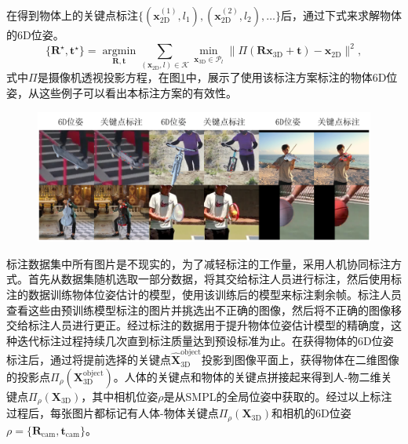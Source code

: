 在得到物体上的关键点标注$\{(\mathbf{x}_{\text{2D}}^{(1)}, l_1), (\mathbf{x}_{\text{2D}}^{(2)}, l_2), \dots\}$后，通过下式来求解物体的6D位姿。
\begin{equation}
	\{\mathbf{R}^\star, \mathbf{t}^\star\} = \mathop{\arg \min}\limits_{\mathbf{R}, \mathbf{t}} \sum_{(\mathbf{x}_{\text{2D}}, l) \in \mathcal{K}} \min_{\mathbf{x}_{\text{3D}} \in \mathcal{P}_{l}} \| \Pi(\mathbf{R} \mathbf{x}_{\text{3D}} + \mathbf{t}) - \mathbf{x}_{\text{2D}} \|^2,
\end{equation}
式中$\Pi$是摄像机透视投影方程，在图\ref{fig:object_pose_annotation}中，展示了使用该标注方案标注的物体6D位姿，从这些例子可以看出本标注方案的有效性。
\begin{figure}[!htbp]
	\centering
	\includegraphics{Img/object_pose_annotation}
	\label{fig:object_pose_annotation}
\end{figure}

标注数据集中所有图片是不现实的，为了减轻标注的工作量，采用人机协同标注方式。首先从数据集随机选取一部分数据，将其交给标注人员进行标注，然后使用标注的数据训练物体位姿估计的模型，使用该训练后的模型来标注剩余帧。标注人员查看这些由预训练模型标注的图片并挑选出不正确的图像，然后将不正确的图像移交给标注人员进行更正。经过标注的数据用于提升物体位姿估计模型的精确度，这种迭代标注过程持续几次直到标注质量达到预设标准为止。在获得物体的6D位姿标注后，通过将提前选择的关键点$\hat{\mathbf{X}}_{\text{3D}}^{\text{object}}$投影到图像平面上，获得物体在二维图像的投影点$\Pi_\rho(\mathbf{X}_{\text{3D}}^{\text{object}})$。人体的关键点和物体的关键点拼接起来得到人-物二维关键点$\Pi_\rho(\mathbf{X}_{\text{3D}})$，其中相机位姿$\rho$是从SMPL的全局位姿中获取的。经过以上标注过程后，每张图片都标记有人体-物体关键点$\Pi_\rho(\mathbf{X}_{\text{3D}})$和相机的6D位姿$\rho=\{\mathbf{R}_{\text{cam}}, \mathbf{t}_{\text{cam}}\}$。

